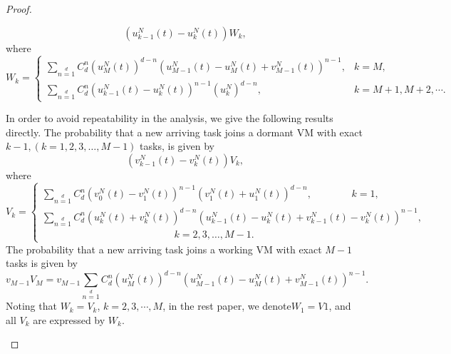 \documentclass[12pt]{article}
\newcommand{\blue}[1]{\textcolor{blue}{#1}}
\begin{document}
\begin{proof}
\begin{description}
              \begin{equation*}
                (u_{k-1}^{N}(t)-u_{k}^{N}(t))W_{k},
              \end{equation*}
              where
              \begin{equation}\label{wk}
                W_{k}=\left\{\begin{array}{ll}
                               \sum\limits_{n=1}\limits^{d}C^{n}_{d}(u_{M}^{N}(t))^{d-n}
                                (u_{M-1}^{N}(t)-u_{M}^{N}(t)+v_{M-1}^{N}(t))^{n-1}, & k=M, \\
                                \sum\limits_{n=1}\limits^{d}C^{n}_{d}(u_{k-1}^{N}(t)-u_{k}^{N}(t))^{n-1}
                                (u_{k}^{N})^{d-n},& k=M+1,M+2,\cdots.
                             \end{array}
                \right.
              \end{equation}
  \item[Arrival process: joining a dormant VM] In order to avoid repeatability in the analysis, we give the following results directly. The probability that a new arriving task joins a dormant VM with exact $k-1,(k=1,2,3,\ldots,M-1)$ tasks, is given by
      \begin{equation*}
                (v_{k-1}^{N}(t)-v_{k}^{N}(t))V_{k},
              \end{equation*}
              where
       \begin{equation*}\label{vk}
                V_{k}=\left\{\begin{array}{ll}
                               \sum\limits_{n=1}\limits^{d}C_{d}^{n}(v_{0}^{N}(t)-v_{1}^{N}(t))^{n-1}(v_{1}^{N}(t)+
                                            u_{1}^{N}(t))^{d-n}, ~~~~~~~~~~~~~~~~~~k=1, \\
                               \sum\limits_{n=1}\limits^{d}C^{n}_{d}(u_{k}^{N}(t)+v_{k}^{N}(t))^{d-n}
                                (u_{k-1}^{N}(t)-u_{k}^{N}(t)+v_{k-1}^{N}(t)-v_{k}^{N}(t))^{n-1},& \\
                                ~~~~~~~~~~~~~~~~~~~~~~~~~~~~~~~~~~~~~~~~~~~~~~~~~~~~~~~~~~~~k=2,3,\ldots,M-1.
                             \end{array}
                \right.
       \end{equation*}
       The probability that a new arriving task joins a working VM with exact $M-1$ tasks is given by
       \begin{equation*}
         v_{M-1}V_{M}= v_{M-1}\sum\limits_{n=1}\limits^{d}C^{n}_{d}(u_{M}^{N}(t))^{d-n}(u_{M-1}^{N}(t)-u_{M}^{N}(t)+v_{M-1}^{N}(t))^{n-1}.
       \end{equation*}
       Noting that $W_{k}=V_{k}$, $k=2,3,\cdots,M$, in the rest paper,  we denote$W_1=V1$, and  all $V_k$ are expressed by $W_k$.%


\end{description}
\end{proof}
\end{document}
